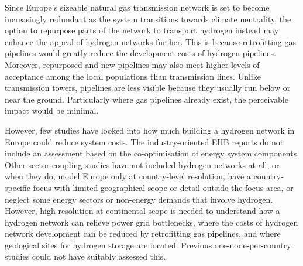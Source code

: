 Since Europe's sizeable natural gas transmission network is set to become
increasingly redundant as the system transitions towards climate neutrality, the
option to repurpose parts of the network to transport hydrogen instead may
enhance the appeal of hydrogen networks further. This is because retrofitting
gas pipelines would greatly reduce the development costs of hydrogen
pipelines.\cite{cerniauskasOptionsNatural2020,tsikliosHydrogenTransport2022}
Moreover, repurposed and new pipelines may also meet higher levels of acceptance
among the local populations than transmission
lines.\cite{schonauerHydrogenFuture2022} Unlike transmission towers, pipelines
are less visible because they usually run below or near the ground. Particularly
where gas pipelines already exist, the perceivable impact would be minimal.

However, few studies have looked into how much building a hydrogen network in
Europe could reduce system costs. The industry-oriented EHB reports do not
include an assessment based on the co-optimisation of energy system components.
\cite{gasforclimateEuropeanHydrogen2020,gasforclimateEuropeanHydrogen2021,gasforclimateExtendingEuropean2021,gasforclimateEuropeanHydrogen2022}
Other sector-coupling studies have not included hydrogen networks at all,
\cite{brownSynergiesSector2018,pickeringDiversityOptions2022,childFlexibleElectricity2019a,kendziorskiCentralizedDecentral2022}
or when they do, model Europe only at country-level resolution,
\cite{europeancommission.directorategeneralforenergy.METISStudy2021,victoriaSpeedTechnological2022}
have a country-specific focus with limited geographical scope or detail outside
the focus area, \cite{gilsInteractionHydrogen2021} or neglect some energy
sectors or non-energy demands that involve hydrogen.
\cite{gilsInteractionHydrogen2021,Caglayan2019,caglayanRobustDesign2021}
However, high resolution at continental scope is needed to understand how a
hydrogen network can relieve power grid bottlenecks, where the costs of hydrogen
network development can be reduced by retrofitting gas pipelines, and where
geological sites for hydrogen storage are located. Previous one-node-per-country
studies could not have suitably assessed this.

